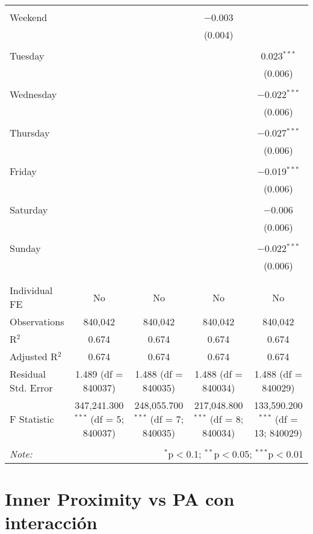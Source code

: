 \documentclass[
]{article}
\begin{document}
\begin{table}[!htbp]
{\begin{tabular}{@{\extracolsep{5pt}}lcccc}
  & & & & \\ 
 Weekend &  &  & $-$0.003 &  \\ 
  &  &  & (0.004) &  \\ 
  & & & & \\ 
 Tuesday &  &  &  & 0.023$^{***}$ \\ 
  &  &  &  & (0.006) \\ 
  & & & & \\ 
 Wednesday &  &  &  & $-$0.022$^{***}$ \\ 
  &  &  &  & (0.006) \\ 
  & & & & \\ 
 Thursday &  &  &  & $-$0.027$^{***}$ \\ 
  &  &  &  & (0.006) \\ 
  & & & & \\ 
 Friday &  &  &  & $-$0.019$^{***}$ \\ 
  &  &  &  & (0.006) \\ 
  & & & & \\ 
 Saturday &  &  &  & $-$0.006 \\ 
  &  &  &  & (0.006) \\ 
  & & & & \\ 
 Sunday &  &  &  & $-$0.022$^{***}$ \\ 
  &  &  &  & (0.006) \\ 
  & & & & \\ 
\hline \\[-1.8ex] 
Individual FE & No & No & No & No \\ 
Observations & 840,042 & 840,042 & 840,042 & 840,042 \\ 
R$^{2}$ & 0.674 & 0.674 & 0.674 & 0.674 \\ 
Adjusted R$^{2}$ & 0.674 & 0.674 & 0.674 & 0.674 \\ 
Residual Std. Error & 1.489 (df = 840037) & 1.488 (df = 840035) & 1.488 (df = 840034) & 1.488 (df = 840029) \\ 
F Statistic & 347,241.300$^{***}$ (df = 5; 840037) & 248,055.700$^{***}$ (df = 7; 840035) & 217,048.800$^{***}$ (df = 8; 840034) & 133,590.200$^{***}$ (df = 13; 840029) \\ 
\hline 
\hline \\[-1.8ex] 
\textit{Note:}  & \multicolumn{4}{r}{$^{*}$p$<$0.1; $^{**}$p$<$0.05; $^{***}$p$<$0.01} \\ 
\end{tabular}
} 
\end{table} 
\newpage
\section{Inner Proximity vs PA con interacción}
\end{document}
